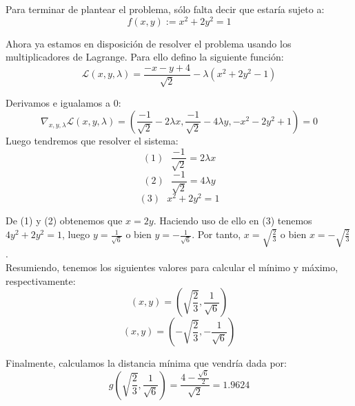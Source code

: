 \documentclass{article}
\begin{document}
 Para terminar de plantear el problema, sólo falta decir que estaría sujeto a:
  \[
  f(x,y):= x^{2}+2y^{2} = 1
  \]
  
 Ahora ya estamos en disposición de resolver el problema usando los multiplicadores de Lagrange. Para ello defino la siguiente función:
  \[
  \mathcal{L}(x,y,\lambda)=\frac{-x-y+4}{\sqrt{2}}-\lambda (x^{2}+2y^{2}-1)
  \]
  
  Derivamos e igualamos a 0:
\[
  \nabla_{x,y,\lambda}\mathcal{L}(x,y,\lambda)=(\frac{-1}{\sqrt{2}} -2\lambda x,\frac{-1}{\sqrt{2}} -4\lambda y,-x^{2}-2y^{2}+1) =0
\]
Luego tendremos que resolver el sistema:
\[
(1)\ \ \  \frac{-1}{\sqrt{2}} = 2\lambda x  
\]
\[
(2)\ \ \  \frac{-1}{\sqrt{2}} = 4\lambda y    
\]
\[
(3)\ \ \ x^{2}+2y^{2}=1   
\]

De (1) y (2) obtenemos que $x=2y$. Haciendo uso de ello en (3) tenemos $4y^{2}+2y^{2}=1$,
luego $y=\frac{1}{\sqrt{6}}$ o bien $y=-\frac{1}{\sqrt{6}}$.
Por tanto, $x=\sqrt{\frac{2}{3}}$ o bien $x=-\sqrt{\frac{2}{3}}$.\\

Resumiendo, tenemos los siguientes valores para calcular el mínimo y máximo, respectivamente:
\[
(x,y)=(\sqrt{\frac{2}{3}}, \frac{1}{\sqrt{6}})
\]
\[
(x,y)=(-\sqrt{\frac{2}{3}}, -\frac{1}{\sqrt{6}})
\]

Finalmente, calculamos la distancia mínima que vendría dada por:
\[
g(\sqrt{\frac{2}{3}}, \frac{1}{\sqrt{6}}) = \frac{4-\frac{\sqrt{6}}{2}}{\sqrt{2}} = 1.9624
\]
\end{document}

